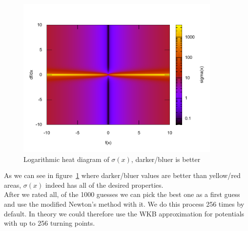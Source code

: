 \documentclass[11pt,DIV=10,final]{scrreprt} %
\begin{document}
\begin{figure}[H]
  \centering
  \includegraphics[width=0.9\textwidth]{plots/newton_rating_func.pdf}
  \caption{Logarithmic heat diagram of $\sigma(x)$, darker/bluer is better}\label{fig:simga-heat}
\end{figure}
As we can see in figure~\ref{fig:simga-heat} where darker/bluer values are better than yellow/red areas, $\sigma(x)$ indeed has all of the desired properties.
\\
After we rated all, of the 1000 guesses we can pick the best one as a first guess and use the modified Newton's method with it. We do this process 256 times by default. In theory we could therefore use the WKB approximation for potentials with up to 256 turning points.
\end{document}
